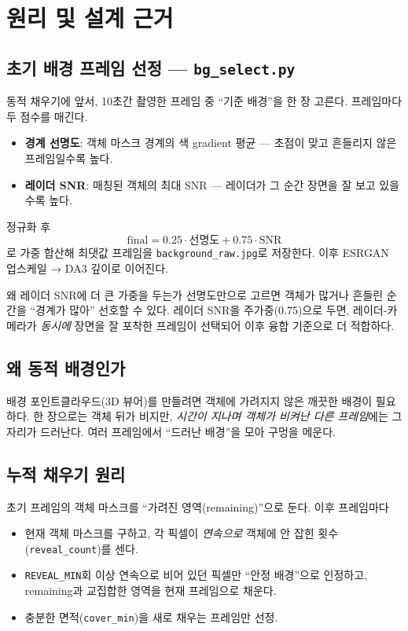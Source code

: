 \begin{statusdone}\end{statusdone}

\chapter{원리 및 설계 근거}

\section{초기 배경 프레임 선정 — \texttt{bg\_select.py}}
동적 채우기에 앞서, 10초간 촬영한 프레임 중 ``기준 배경''을 한 장 고른다.
프레임마다 두 점수를 매긴다.
\begin{itemize}
  \item \textbf{경계 선명도}: 객체 마스크 경계의 색 gradient 평균 — 초점이 맞고
        흔들리지 않은 프레임일수록 높다.
  \item \textbf{레이더 SNR}: 매칭된 객체의 최대 SNR — 레이더가 그 순간 장면을
        잘 보고 있을수록 높다.
\end{itemize}
정규화 후 \[ \text{final} = 0.25\cdot\text{선명도} + 0.75\cdot\text{SNR} \]
로 가중 합산해 최댓값 프레임을 \texttt{background\_raw.jpg}로 저장한다. 이후
ESRGAN 업스케일 → DA3 깊이로 이어진다.

\begin{designbox}{왜 레이더 SNR에 더 큰 가중을 두는가}
선명도만으로 고르면 객체가 많거나 흔들린 순간을 ``경계가 많아'' 선호할 수 있다.
레이더 SNR을 주가중(0.75)으로 두면, 레이더-카메라가 \emph{동시에} 장면을 잘
포착한 프레임이 선택되어 이후 융합 기준으로 더 적합하다.
\end{designbox}

\section{왜 동적 배경인가}
배경 포인트클라우드(3D 뷰어)를 만들려면 객체에 가려지지 않은 깨끗한 배경이
필요하다. 한 장으로는 객체 뒤가 비지만, \emph{시간이 지나며 객체가 비켜난 다른
프레임}에는 그 자리가 드러난다. 여러 프레임에서 ``드러난 배경''을 모아 구멍을
메운다.

\section{누적 채우기 원리}
초기 프레임의 객체 마스크를 ``가려진 영역(remaining)''으로 둔다. 이후 프레임마다
\begin{itemize}
  \item 현재 객체 마스크를 구하고, 각 픽셀이 \emph{연속으로} 객체에 안 잡힌
        횟수(\texttt{reveal\_count})를 센다.
  \item \texttt{REVEAL\_MIN}회 이상 연속으로 비어 있던 픽셀만 ``안정 배경''으로
        인정하고, remaining과 교집합한 영역을 현재 프레임으로 채운다.
  \item 충분한 면적(\texttt{cover\_min})을 새로 채우는 프레임만 선정.
\end{itemize}

